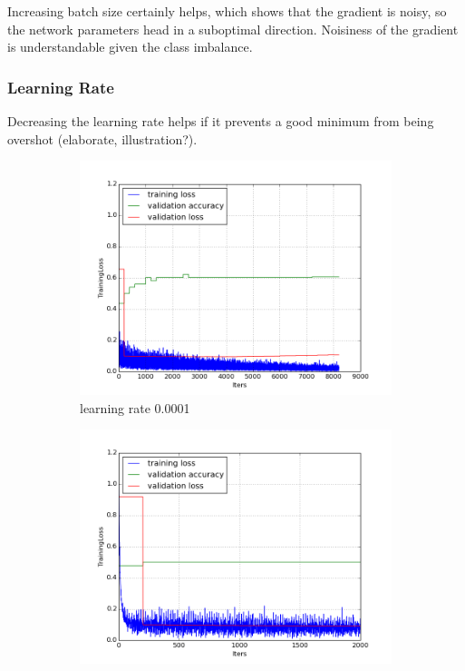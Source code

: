 \documentclass[a4paper,11pt]{article}
\begin{document}
Increasing batch size certainly helps, which shows that the gradient is noisy, so the network parameters head in a suboptimal direction. Noisiness of the gradient is understandable given the class imbalance. \\


\subsubsection{Learning Rate}

Decreasing the learning rate helps if it prevents a good minimum from being overshot (elaborate, illustration?). \\ 

\begin{figure}
    \centering
    \begin{minipage}[b]{\textwidth}
      \begin{subfigure}{.5\textwidth} 
        \centering
        \includegraphics[scale=0.4]{images/plot_clampdetCI98_none_bs256_lr4.png}
        \caption{learning rate 0.0001}\label{fig:2a}
      \end{subfigure}%
      \begin{subfigure}{.5\textwidth} 
        \centering
        \includegraphics[scale=0.4]{images/plot_clampdetCI98_none_bs256_lr5.png}

\end{subfigure}
\end{minipage}
\end{figure}
\end{document}
